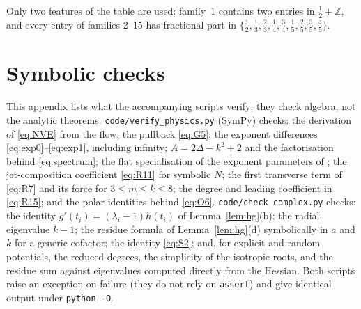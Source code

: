 \documentclass[11pt]{article}
\numberwithin{equation}{section}
\theoremstyle{definition}
\theoremstyle{remark}
\newcommand{\Z}{\mathbb Z}
\begin{document}
Only two features of the table are used: family~1 contains two entries in $\tfrac12+\Z$, and every entry of families
2--15 has fractional part in $\{\tfrac12,\tfrac13,\tfrac23,\tfrac14,\tfrac34,\tfrac15,\tfrac25,\tfrac35,\tfrac45\}$.

\section{Symbolic checks}\label{app:code}

This appendix lists what the accompanying scripts verify; they check algebra, not the analytic theorems.
\texttt{code/verify\_physics.py} (SymPy) checks: the derivation of \eqref{eq:NVE} from the flow; the pullback
\eqref{eq:G5}; the exponent differences \eqref{eq:exp0}--\eqref{eq:exp1}, including infinity; $A=2\Delta-k^2+2$ and
the factorisation behind \eqref{eq:spectrum}; the flat specialisation of the exponent parameters of \cite{SP25}; the
jet-composition coefficient \eqref{eq:R11} for symbolic $N$; the first transverse term of \eqref{eq:R7} and its force
for $3\le m\le k\le8$; the degree and leading coefficient in \eqref{eq:R15}; and the polar identities behind
\eqref{eq:O6}. \texttt{code/check\_complex.py} checks: the identity $g'(t_i)=(\lambda_i-1)h(t_i)$ of
Lemma~\ref{lem:hg}(b); the radial eigenvalue $k-1$; the residue formula of Lemma~\ref{lem:hg}(d) symbolically in $a$ and
$k$ for a generic cofactor; the identity \eqref{eq:S2}; and, for explicit and random potentials, the reduced degrees,
the simplicity of the isotropic roots, and the residue sum against eigenvalues computed directly from the Hessian. Both
scripts raise an exception on failure (they do not rely on \texttt{assert}) and give identical output under
\texttt{python -O}.
\end{document}
